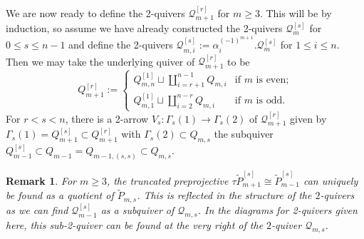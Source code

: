 \documentclass{amsart}
\newtheorem{remark}[theorem]{Remark}
\numberwithin{equation}{section}
\newcommand{\cQ}{\mathcal{Q}}
\begin{document}
We are now ready to define the 2-quivers $\cQ_{m+1}^{[r]}$ for $m\ge3$.
This will be by induction, so assume we have already constructed the 2-quivers $\cQ_m^{[s]}$ for $0\le s\le n-1$ and define the 2-quivers $\cQ_{m,i}^{[s]}:=\alpha_i^{(-1)^{m+1}}.\cQ_m^{[s]}$ for $1\le i\le n$. 
Then we may take the underlying quiver of $\cQ_{m+1}^{[r]}$ to be
\begin{equation}
  \label{eq:recursive 2-quivers}
  Q_{m+1}^{[r]}:=
  \begin{cases}
    Q_{m,n}^{[1]}\sqcup\coprod\limits_{i=r+1}^{n-1} Q_{m,i} & \text{if $m$ is even;}\\
    Q_{m,1}^{[1]}\sqcup\coprod\limits_{i=2}^{n-r} Q_{m,i} & \text{if $m$ is odd.}
  \end{cases}
\end{equation}
For $r<s<n$, there is a 2-arrow $V_s:\Gamma_s(1)\to\Gamma_s(2)$ of $\cQ_{m+1}^{[r]}$ given by $\Gamma_s(1)=Q_{m+1}^{[s]}\subset Q_{m+1}^{[r]}$ with $\Gamma_s(2)\subset Q_{m,s}$ the subquiver $Q_{m-1}^{[s]}\subset Q_{m-1}=Q_{m-1,(s,s)}\subset Q_{m,s}$.
\begin{remark}
  For $m\geq 3$, the truncated preprojective $\tau\tilde P_{m+1}^{[s]}\cong\tilde P_{m-1}^{[s]}$ can uniquely be found as a quotient of $\tilde P_{m,s}$.
  This is reflected in the structure of the $2$-quivers as we can find $\cQ_{m-1}^{[s]}$ as a subquiver of $\cQ_{m,s}$.
  In the diagrams for 2-quivers given here, this sub-2-quiver can be found at the very right of the $2$-quiver $\mathcal Q_{m,s}$.
\end{remark}
\end{document}
